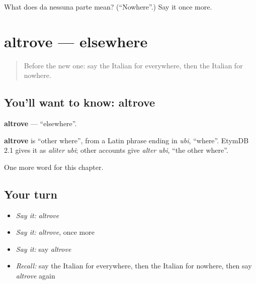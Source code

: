 \begin{tcolorbox}[breakable,colback=teal!4,colframe=teal!35!black,title={Before you move on}]
What does da nessuna parte mean? (\textquotedblleft{}Nowhere\textquotedblright{}.) Say it once more.
\end{tcolorbox}
\section[altrove]{altrove — elsewhere}

\label{lesson:IT-C154-altrove}



\begin{quote}
Before the new one: say the Italian for everywhere, then the Italian for nowhere.
\end{quote}

\subsection*{You'll want to know: altrove}
\textbf{altrove} — \textquotedblleft{}elsewhere\textquotedblright{}.

\begin{cousinweb}
\textbf{altrove} is \textquotedblleft{}other where\textquotedblright{}, from a Latin phrase ending in \emph{ubi}, \textquotedblleft{}where\textquotedblright{}. EtymDB 2.1 gives it as \emph{aliter ubi}; other accounts give \emph{alter ubi}, \textquotedblleft{}the other where\textquotedblright{}.
\end{cousinweb}

\begin{grammarlens}[title={What you've built}]
One more word for this chapter.
\end{grammarlens}

\subsection*{Your turn}
\begin{itemize}
\raggedright
  \item \emph{Say it:} \emph{altrove}
  \item \emph{Say it:} \emph{altrove}, once more
  \item \emph{Say it:} say \emph{altrove}
  \item \emph{Recall:} say the Italian for everywhere, then the Italian for nowhere, then say \emph{altrove} again
\end{itemize}

